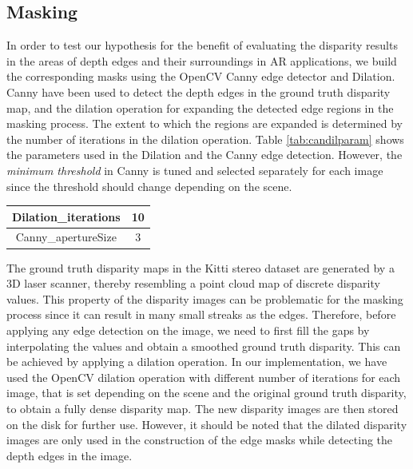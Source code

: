 \subsection{Masking}
In order to test our hypothesis for the benefit of evaluating the disparity results in the areas of depth edges and their surroundings in AR applications, 
we build the corresponding masks using
the OpenCV Canny edge detector and Dilation.
Canny have been used to detect the depth edges in the ground truth disparity map, and the dilation operation 
for expanding the detected edge regions in the masking process. The extent to which the regions are expanded
is determined by the number of iterations in the dilation operation. Table \ref{tab:candilparam} shows the parameters used in the Dilation
and the Canny edge detection. However, the \textit{minimum threshold} in Canny is tuned and selected separately for each image 
since the threshold should change depending on the scene. \newline

\begin{minipage}{\linewidth}
\begin{center}
\label{tab:candilparam}
\begin{tabular}{ |c|c| }
\hline
Dilation\_iterations & 10 \\  \hline
Canny\_apertureSize & 3 \\ \hline
\end{tabular}
\end{center}
\end{minipage} \newline

The ground truth disparity maps in the Kitti stereo dataset are generated by a 3D laser scanner, thereby resembling
a point cloud map of discrete disparity values. This property of the disparity images 
can be problematic for the masking process since it can result in many small streaks as the edges.
Therefore, before applying any edge
detection on the image, we need to first fill the gaps by interpolating the values and obtain a smoothed ground truth disparity.
This can be achieved by applying a dilation operation.
In our implementation, we have used the OpenCV dilation operation with different number of iterations for each image, that is set depending on the scene 
and the original ground truth disparity, to obtain a fully dense disparity map. 
The new disparity images are then stored on the disk for further use.
However, it should be noted that the dilated disparity images are only used in the construction of the edge masks while detecting the depth
edges in the image.

